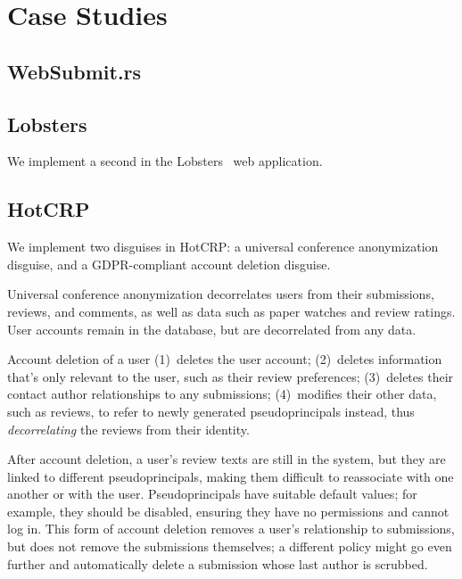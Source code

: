 \section{Case Studies}

\subsection{WebSubmit.rs}

\subsection{Lobsters}
We implement a second in the Lobsters~\cite{lobsters} web application.

\subsection{HotCRP}
We implement two disguises in HotCRP: a universal conference anonymization disguise, and a
GDPR-compliant account deletion disguise.

Universal conference anonymization decorrelates users from their submissions, reviews, and comments,
as well as data such as paper watches and review ratings. User accounts remain in the database, but
are decorrelated from any data.

 Account deletion of a user 
%
(1)~deletes the user account;
%
(2)~deletes information that's only relevant to the user, such as their review preferences;
%
(3)~deletes their contact author relationships to any submissions;
%
(4)~modifies their other data, such as reviews, to refer to newly generated pseudoprincipals
instead, thus \emph{decorrelating} the reviews from their identity.

After account deletion, a user's review texts are still in the system, but they are linked to
different pseudoprincipals, making them difficult to reassociate with one another or with the user.
%
Pseudoprincipals have suitable default values; for example, they should be disabled, ensuring they
have no permissions and cannot log in.
%
This form of account deletion removes a user's relationship to submissions, but does not remove the
submissions themselves; a different policy might go even further and automatically delete a
submission whose last author is scrubbed.
